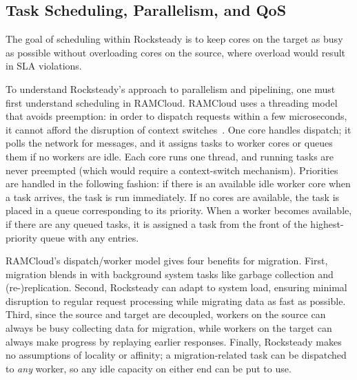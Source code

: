 \subsection{Task Scheduling, Parallelism, and QoS}
\label{sec:qos}

The goal of scheduling within Rocksteady is to keep cores on the target as
busy as possible without overloading cores on the source, where overload 
would result in SLA violations.

To understand Rocksteady's approach to parallelism and pipelining, one
must first understand scheduling in RAMCloud.
RAMCloud uses a threading model that avoids preemption: in order to dispatch requests
within a few microseconds, it cannot afford the disruption of context
switches~\cite{ramcloud}. One core handles dispatch; it polls the network
for messages, and it assigns tasks to worker cores or queues them if no workers
are idle. Each core runs one thread, and
running tasks are never preempted (which would require a
context-switch mechanism).
Priorities are handled in the following fashion: if there is an available
idle worker core when a task arrives, the task is run immediately. If no
cores are available, the task is placed in a queue corresponding to its
priority. When a worker becomes available, if there are any queued tasks,
it is assigned a task from the front of the highest-priority queue with
any entries.

RAMCloud's dispatch/worker model gives four benefits for migration. First,
migration blends in with background system tasks like garbage collection and
(re-)replication. Second, Rocksteady can adapt to system load, ensuring minimal
disruption to regular request processing while migrating data
as fast as possible. Third, since the source and
target are decoupled, workers on the source can always be busy collecting data
for migration, while workers on the target can always make progress by
replaying earlier responses.  Finally, Rocksteady makes no assumptions of
locality or affinity; a migration-related task can be
dispatched to \emph{any} worker, so any idle capacity on either end can be put
to use.




